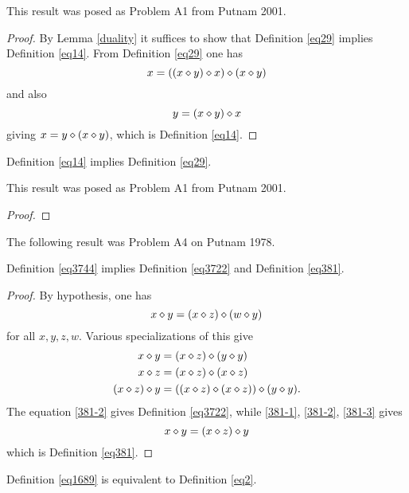 This result was posed as Problem A1 from Putnam 2001.

\begin{proof}\leanok{} By Lemma \ref{duality} it suffices to show that Definition \ref{eq29} implies Definition \ref{eq14}.  From Definition \ref{eq29} one has
  $$ x = ((x \diamond y) \diamond x) \diamond (x \diamond y)$$
  and also
  $$ y = (x \diamond y) \diamond x$$
  giving $x = y \diamond (x \diamond y)$, which is Definition \ref{eq14}.
\end{proof}

\begin{theorem}[14 implies 29]\label{14_implies_29} \leanok  Definition \ref{eq14} implies Definition \ref{eq29}.
\end{theorem}

This result was posed as Problem A1 from Putnam 2001.

\begin{proof}\leanok
\end{proof}

The following result was Problem A4 on Putnam 1978.

\begin{theorem}[3744 implies 3722, 381]\label{3744_implies_3722_381} Definition \ref{eq3744} implies Definition \ref{eq3722} and Definition \ref{eq381}.
\end{theorem}

\begin{proof} By hypothesis, one has
$$x \diamond y = (x \diamond z) \diamond (w \diamond y)
  $$
for all $x,y,z,w$.  Various specializations of this give
\begin{align}
 x \diamond y &= (x \diamond z) \diamond (y \diamond y) \label{381-1} \\
 x \diamond z &= (x \diamond z) \diamond (x \diamond z) \label{381-2} \\
(x \diamond z) \diamond y &= ((x \diamond z) \diamond (x \diamond z)) \diamond (y \diamond y) \label{381-3}.
\end{align}
The equation \eqref{381-2} gives Definition \ref{eq3722}, while \eqref{381-1}, \eqref{381-2}, \eqref{381-3} gives
$$ x \diamond y = (x\diamond z) \diamond y$$
which is Definition \ref{eq381}.
\end{proof}

\begin{theorem}[1689 is equivalent to 2]\label{1689_equiv_2} Definition \ref{eq1689} is equivalent to Definition \ref{eq2}.
\end{theorem}


